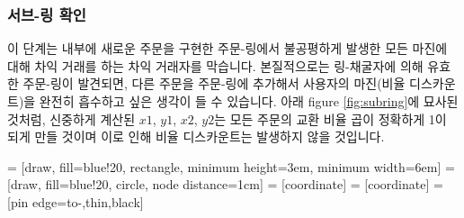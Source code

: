 \documentclass[UTF8,nofonts]{article}
\makeatletter
\newenvironment{figurehere}
 {\def\@captype{figure}}
 {}
\makeatother
\begin{document}
\begin{multicols}{2}
\subsubsection{서브-링 확인\label{sec:sub_ring_check}}
이 단계는 내부에 새로운 주문을 구현한 주문-링에서 불공평하게 발생한 모든 마진에 대해 차익 거래를 하는 차익 거래자를 막습니다. 본질적으로는 링-채굴자에 의해 유효한 주문-링이 발견되면, 다른 주문을 주문-링에 추가해서 사용자의 마진(비율 디스카운트)을 완전히 흡수하고 싶은 생각이 들 수 있습니다. 아래 figure \ref{fig:subring}에 묘사된 것처럼, 신중하게 계산된 $x1$, $y1$, $x2$, $y2$는 모든 주문의 교환 비율 곱이 정확하게 1이 되게 만들 것이며 이로 인해 비율 디스카운트는 발생하지 않을 것입니다.  

\begin{center}
\begin{figurehere}
\centering
{} = [draw, fill=blue!20, rectangle, 
    minimum height=3em, minimum width=6em]
 = [draw, fill=blue!20, circle, node distance=1cm]
 = [coordinate]
 = [coordinate]
 = [pin edge={to-,thin,black}]

\end{figurehere}
\end{center}
\end{multicols}
\end{document}
